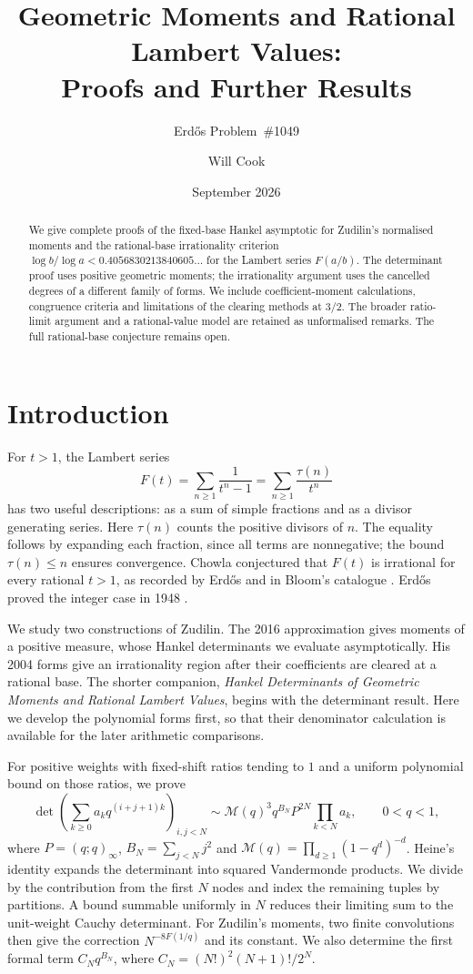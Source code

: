 \documentclass[11pt]{article}
\title{Geometric Moments and Rational Lambert Values:\\Proofs and Further Results}
\subtitle{Erd\H{o}s Problem~\#1049}
\author{Will Cook}
\date{September 2026}
\begin{document}
\maketitle
\noteprovenance

\begin{abstract}
We give complete proofs of the fixed-base Hankel asymptotic for
Zudilin's normalised moments and the rational-base irrationality
criterion $\log b/\log a<0.4056830213840605\ldots$ for the Lambert
series $F(a/b)$. The determinant proof uses positive geometric
moments; the irrationality argument uses the cancelled degrees of
a different family of forms. We include coefficient-moment
calculations, congruence criteria and limitations of the clearing
methods at $3/2$. The broader ratio-limit argument and a
rational-value model are retained as unformalised remarks.
The full rational-base conjecture remains open.
\end{abstract}

\section{Introduction}\label{long1049:sec:problem}

For $t>1$, the Lambert series
\[
 F(t)=\sum_{n\ge1}\frac1{t^n-1}
     =\sum_{n\ge1}\frac{\tau(n)}{t^n}
\]
has two useful descriptions: as a sum of simple fractions and as
a divisor generating series. Here $\tau(n)$ counts the positive
divisors of $n$. The equality follows by expanding each fraction,
since all terms are nonnegative; the bound $\tau(n)\le n$ ensures
convergence. Chowla conjectured that $F(t)$ is irrational for every
rational $t>1$, as recorded by Erd\H{o}s \cite[p.~102]{erdos1988}
and in Bloom's catalogue \cite{erdosproblems}. Erd\H{o}s proved the
integer case in 1948 \cite{erdos1948}.

We study two constructions of Zudilin. The 2016 approximation
\cite{zudilin2016} gives moments of a positive measure, whose Hankel
determinants we evaluate asymptotically. His 2004 forms \cite{zudilin2004} give
an irrationality region after their coefficients are cleared at a
rational base. The shorter companion, \emph{Hankel Determinants of
Geometric Moments and Rational Lambert Values}, begins with the
determinant result. Here we develop the polynomial forms first,
so that their denominator calculation is available for the later
arithmetic comparisons.

For positive weights with fixed-shift ratios tending to $1$ and a
uniform polynomial bound on those ratios, we prove
\[
 \det\left(\sum_{k\ge0}a_kq^{(i+j+1)k}\right)_{i,j<N}
 \sim\mathcal M(q)^3q^{B_N}P^{2N}\prod_{k<N}a_k,
 \qquad 0<q<1,
\]
where $P=(q;q)_\infty$, $B_N=\sum_{j<N}j^2$ and
$\mathcal M(q)=\prod_{d\ge1}(1-q^d)^{-d}$.
Heine's identity expands the determinant into squared Vandermonde
products. We divide by the contribution from the first $N$ nodes
and index the remaining tuples by partitions. A bound summable
uniformly in $N$ reduces their limiting sum to the unit-weight
Cauchy determinant. For Zudilin's moments, two finite convolutions
then give the correction $N^{-8F(1/q)}$ and its constant.
We also determine the first formal term $C_Nq^{B_N}$, where
$C_N=(N!)^2(N+1)!/2^N$.
\end{document}
